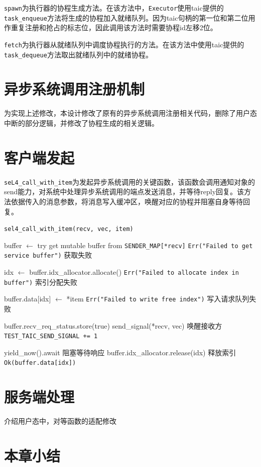 \texttt{spawn}为执行器的协程生成方法。在该方法中，\texttt{Executor}使用taic提供的\texttt{task\_enqueue}方法将生成的协程加入就绪队列。因为taic句柄的第一位和第二位用作重复注册和抢占的标志位，因此调用该方法时需要协程id左移2位。

\texttt{fetch}为执行器从就绪队列中调度协程执行的方法。在该方法中使用taic提供的\texttt{task\_dequeue}方法取出就绪队列中的就绪协程。


\section{异步系统调用注册机制}

为实现上述修改，本设计修改了原有的异步系统调用注册相关代码，删除了用户态中断的部分逻辑，并修改了协程生成的相关逻辑。

\section{客户端发起}

\texttt{seL4\_call\_with\_item}为发起异步系统调用的关键函数，该函数会调用通知对象的send能力，对系统中处理异步系统调用的端点发送消息，并等待reply回复。该方法依据传入的消息参数，将消息写入缓冲区，唤醒对应的协程并阻塞自身等待回复。

\begin{algorithm}
\caption{\texttt{sel4\_call\_with\_item(recv, vec, item)}}
\begin{algorithmic}[0]  %
\State buffer $\gets$ try get mutable buffer from \texttt{SENDER\_MAP[*recv]}
    \State \Return \texttt{Err("Failed to get service buffer")} \Comment 获取失败
\EndIf

\State idx $\gets$ buffer.idx\_allocator.allocate()
    \State \Return \texttt{Err("Failed to allocate index in buffer")} \Comment 索引分配失败
\EndIf

\State buffer.data[idx] $\gets$ *item
    \State \Return \texttt{Err("Failed to write free index")} \Comment 写入请求队列失败
\EndIf

    \State buffer.recv\_req\_status.store(true)
    \State send\_signal(*recv, vec) \Comment 唤醒接收方
    \State \texttt{TEST\_TAIC\_SEND\_SIGNAL += 1}
\EndIf

\State yield\_now().await \Comment 阻塞等待响应
\State buffer.idx\_allocator.release(idx) \Comment 释放索引
\State \Return \texttt{Ok(buffer.data[idx])}
\end{algorithmic}
\end{algorithm}

\section{服务端处理}


介绍用户态中，对等函数的适配修改

\section{本章小结}
